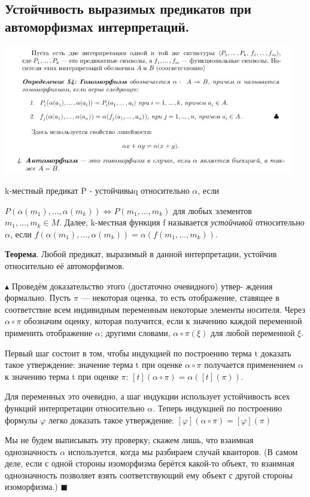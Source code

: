 \setcounter{subsection}{4}
\subsection{Устойчивость выразимых предикатов при автоморфизмах интерпретаций.}

\includegraphics[width=0.95\textwidth]{images/1.5_def}

k-местный предикат P - устойчивыq относительно $\alpha$, если

$P(\alpha(m_1), \dots , \alpha(m_k)) \Leftrightarrow P(m_1, . . . ,m_k)$
для любых элементов $m_1, \dots, m_k \in M$. Далее, k-местная функция f называется \emph{устойчивой} относительно $\alpha$, если
$f(\alpha(m_1), \dots, \alpha(m_k)) = \alpha(f(m_1, \dots ,m_k))$.

\textbf{Теорема}. Любой предикат, выразимый в данной интерпретации, устойчив относительно её автоморфизмов.

$\blacktriangle$
Проведём доказательство этого (достаточно очевидного) утвер-
ждения формально.
Пусть $\pi$ — некоторая оценка, то есть отображение, ставящее в соответствие всем индивидным переменным некоторые элементы носителя. Через $\alpha \circ \pi$ обозначим оценку, которая получится, если к значению каждой переменной применить отображение $\alpha$; другими
словами, $\alpha \circ \pi (\xi)$ для любой переменной $\xi$.

Первый шаг состоит в том, чтобы индукцией по построению терма t доказать такое утверждение: значение терма t при оценке $\alpha \circ \pi$ получается применением $\alpha$ к значению терма t при оценке $\pi$: $[t](\alpha \circ \pi) = \alpha([t](\pi))$.

Для переменных это очевидно, а шаг индукции использует устойчивость всех функций интерпретации относительно $\alpha$. Теперь индукцией по построению формулы $\varphi$ легко доказать такое утверждение: $[\varphi](\alpha \circ \pi) = [\varphi](\pi)$

Мы не будем выписывать эту проверку; скажем лишь, что взаимная однозначность $\alpha$ используется, когда мы разбираем случай кванторов. (В самом деле, если с одной стороны изоморфизма берётся какой-то объект, то взаимная однозначность позволяет взять соответствующий ему объект с другой стороны изоморфизма.)
$\blacksquare$

